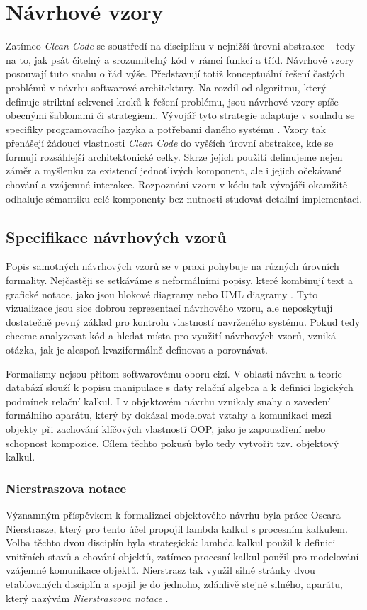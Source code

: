 \documentclass[FM,DP,fonts]{tulthesis}
\begin{document}
\section{Návrhové vzory}
\label{chapter:design_patterns}
Zatímco \textit{Clean Code} se soustředí na disciplínu v nejnižší úrovni abstrakce – tedy na to, jak psát čitelný a srozumitelný kód v rámci funkcí a tříd. Návrhové vzory posouvají tuto snahu o řád výše. Představují totiž konceptuální řešení častých problémů v návrhu softwarové architektury. Na rozdíl od algoritmu, který definuje striktní sekvenci kroků k řešení problému, jsou návrhové vzory spíše obecnými šablonami či strategiemi. Vývojář tyto strategie adaptuje v souladu se specifiky programovacího jazyka a potřebami daného systému \parencite{refactoring-guru-patterns}. Vzory tak přenášejí žádoucí vlastnosti \textit{Clean Code} do vyšších úrovní abstrakce, kde se formují rozsáhlejší architektonické celky. Skrze jejich použití definujeme nejen záměr a myšlenku za existencí jednotlivých komponent, ale i jejich očekávané chování a vzájemné interakce. Rozpoznání vzoru v kódu tak vývojáři okamžitě odhaluje sémantiku celé komponenty bez nutnosti studovat detailní implementaci.

\subsection{Specifikace návrhových vzorů}
Popis samotných návrhových vzorů se v praxi pohybuje na různých úrovních formality. Nejčastěji se setkáváme s neformálními popisy, které kombinují text a grafické notace, jako jsou blokové diagramy nebo UML diagramy \parencite{refactoring-guru-patterns}. Tyto vizualizace jsou sice dobrou reprezentací návrhového vzoru, ale neposkytují dostatečně pevný základ pro kontrolu vlastností navrženého systému. Pokud tedy chceme analyzovat kód a hledat místa pro využití návrhových vzorů, vzniká otázka, jak je alespoň kvaziformálně definovat a porovnávat.

Formalismy nejsou přitom softwarovému oboru cizí. V oblasti návrhu a teorie databází slouží k popisu manipulace s daty relační algebra a k definici logických podmínek relační kalkul. I v objektovém návrhu vznikaly snahy o zavedení formálního aparátu, který by dokázal modelovat vztahy a komunikaci mezi objekty při zachování klíčových vlastností OOP, jako je zapouzdření nebo schopnost kompozice. Cílem těchto pokusů bylo tedy vytvořit tzv. objektový kalkul.

\subsubsection{Nierstraszova notace}
Významným příspěvkem k formalizaci objektového návrhu byla práce Oscara Nierstrasze, který pro tento účel propojil lambda kalkul s procesním kalkulem. Volba těchto dvou disciplín byla strategická: lambda kalkul použil k definici vnitřních stavů a chování objektů, zatímco procesní kalkul použil pro modelování vzájemné komunikace objektů. Nierstrasz tak využil silné stránky dvou etablovaných disciplín a spojil je do jednoho, zdánlivě stejně silného, aparátu, který nazývám \textit{Nierstraszova notace} \parencite{nierstrasz-object-calculus}.
\end{document}
